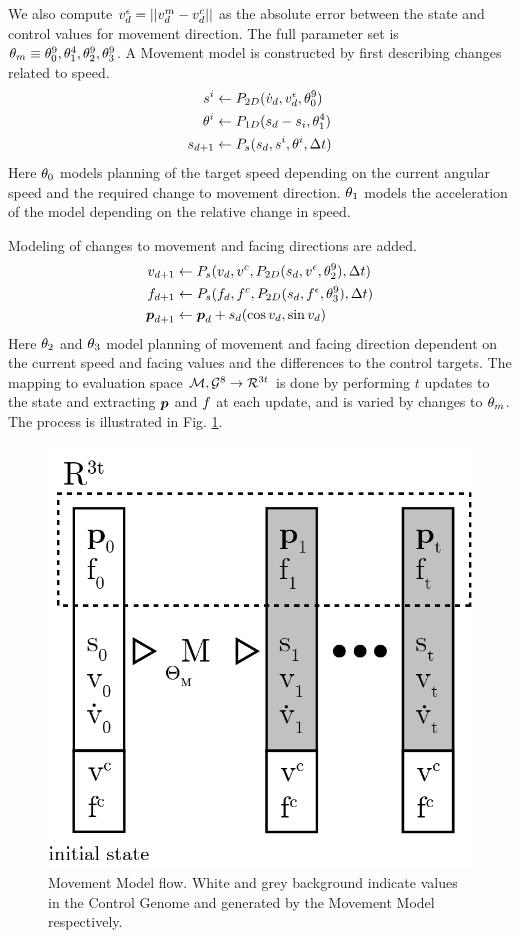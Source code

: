 We also compute $v^\epsilon_d=||v_d^m-v^c_d||$ as the absolute error between the state and control values for movement direction. The full parameter set is $\theta_{m}\equiv\theta_0^9,\theta_1^4,\theta_2^9,\theta_3^9$. A Movement model is constructed by first describing changes related to speed.
\begin{subequations}
\begin{align}
    s^i&\leftarrow{}P_{2D}({\dot{v}}_d,v^\epsilon_d,\theta_0^9)\\
    \theta^i&\leftarrow{}P_{1D}(s_d-s_i, \theta_1^4)\\
    s_{d+1}&\leftarrow{}P_s(s_d,s^i,\theta^i,\Delta{t})
\end{align}
\end{subequations}
Here $\theta_0$ models planning of the target speed depending on the current angular speed and the required change to movement direction. $\theta_1$ models the acceleration of the model depending on the relative change in speed.

Modeling of changes to movement and facing directions are added.
\begin{subequations}
\begin{align}
    v_{d+1}&\leftarrow P_s(v_d,v^c,P_{2D}(s_{d},v^\epsilon, \theta_2^9),\Delta{t})\\ 
    f_{d+1}&\leftarrow P_s(f_d,f^c,P_{2D}(s_{d},f^\epsilon, \theta_3^9),\Delta{t})\\
    \boldsymbol{p }_{d+1}&\leftarrow{}\boldsymbol{p }_d+s_{d}(\cos{v_d},\sin{v_d})
\end{align}
\end{subequations}
Here $\theta_2$ and $\theta_3$ model planning of movement and facing direction dependent on the current speed and facing values and the differences to the control targets.
The mapping to evaluation space $\mathcal{M},\mathcal{G}^{8}\rightarrow\mathcal{R}^{3t}$ is done by performing $t$ updates to the state and extracting $\boldsymbol{p }$ and $f$ at each update, and is varied by changes to $\theta_{m}$. The process is illustrated in Fig. \ref{fig:control:modelflow}. 
\begin{figure}
    \centering
    \includegraphics[width=0.5\columnwidth]{img/model_flow.png}
    \caption{Movement Model flow. White and grey background indicate values in the Control Genome and generated by the Movement Model respectively.}
    \label{fig:control:modelflow}
\end{figure}

